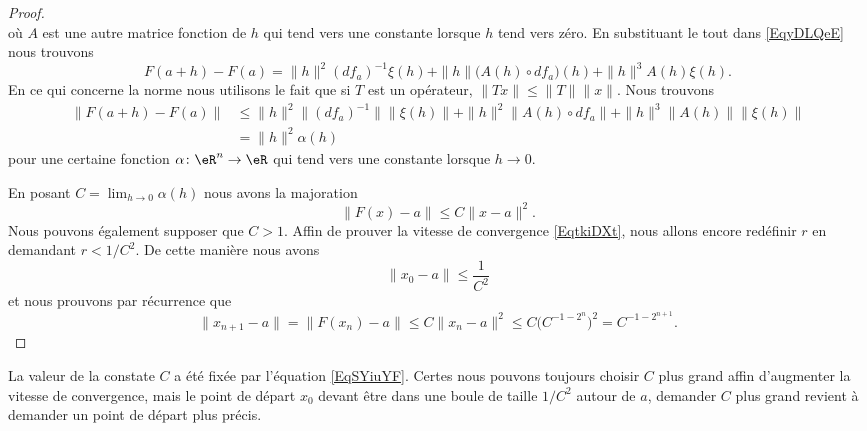 \begin{proof}
\begin{equation}
        \end{equation}
        où \( A\) est une autre matrice fonction de \(h\) qui tend vers une constante lorsque \( h\) tend vers zéro. En substituant le tout dans \eqref{EqyDLQeE} nous trouvons
        \begin{equation}
            F(a+h)-F(a)=\| h \|^2(df_a)^{-1}\xi(h)+\| h \|\big( A(h)\circ df_a \big)(h)+\| h \|^3A(h)\xi(h).
        \end{equation}
        En ce qui concerne la norme nous utilisons le fait que si \( T\) est un opérateur, \( \| Tx \|\leq \| T \|\| x \|\). Nous trouvons
        \begin{subequations}
            \begin{align}
                \| F(a+h)-F(a) \|&\leq \| h \|^2\| (df_a)^{-1} \|\| \xi(h) \|+\| h \|^2\| A(h)\circ df_a \|+\| h \|^3\| A(h) \|\| \xi(h) \|\\
                &=\| h \|^2\alpha(h)
            \end{align}
        \end{subequations}
    pour une certaine fonction \( \alpha\colon \eR^n\to \eR\) qui tend vers une constante lorsque \( h\to 0\). 

    En posant \( C=\lim_{h\to 0}\alpha(h) \) nous avons la majoration
    \begin{equation}        \label{EqSYiuYF}
        \| F(x)-a \|\leq C\| x-a \|^2.
    \end{equation}
    Nous pouvons également supposer que \( C>1\). Affin de prouver la vitesse de convergence \eqref{EqtkiDXt}, nous allons encore redéfinir \( r\) en demandant \( r<1/C^2\). De cette manière nous avons
    \begin{equation}
        \| x_0-a \|\leq \frac{1}{ C^2 }
    \end{equation}
    et nous prouvons par récurrence que 
    \begin{equation}
        \| x_{n+1}-a \|=\| F(x_n)-a \|\leq C\| x_n-a \|^2\leq C\big( C^{-1-2^n} \big)^2=C^{-1-2^{n+1}}.
    \end{equation}

\end{proof}

\begin{remark}  \label{RemOxOmln}
    La valeur de la constate \( C\) a été fixée par l'équation \eqref{EqSYiuYF}. Certes nous pouvons toujours choisir \( C\) plus grand affin d'augmenter la vitesse de convergence, mais le point de départ \( x_0\) devant être dans une boule de taille \( 1/C^2\) autour de \( a\), demander \( C \) plus grand revient à demander un point de départ plus précis.
\end{remark}

